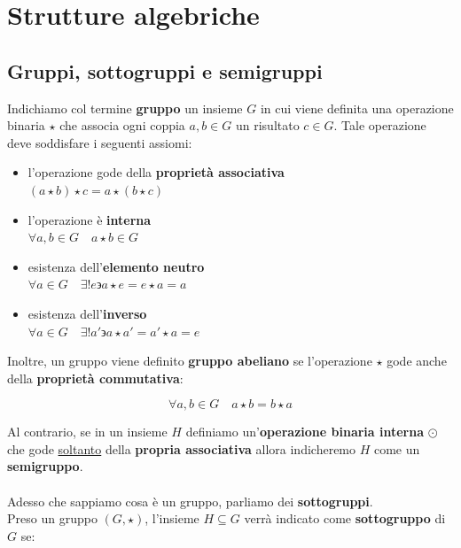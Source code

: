 \section{Strutture algebriche}
\subsection{Gruppi, sottogruppi e semigruppi}
Indichiamo col termine \textbf{gruppo} un insieme \(G\) in cui viene definita
una operazione binaria \(\star\) che associa ogni coppia \(a,b \in G\) un risultato
\(c \in G\). Tale operazione deve soddisfare i seguenti assiomi:

\begin{itemize}

  \item 
  l'operazione gode della \textbf{proprietà associativa} \\
  \((a \star b) \star c = a \star (b \star c)\) \\

  \item 
  l'operazione è \textbf{interna} \\
  \( \forall a,b \in G \quad a \star b \in G\)

  \item
  esistenza dell'\textbf{elemento neutro} \\
  \( \forall a \in G \quad \exists!e \backepsilon a \star e = e \star a = a \) \\

  \item
  esistenza dell'\textbf{inverso} \\
  \( \forall a \in G \quad \exists!a' \backepsilon a \star a' = a' \star a = e \) \\

\end{itemize}

Inoltre, un gruppo viene definito \textbf{gruppo abeliano} se l'operazione \(\star\) 
gode anche della \textbf{proprietà commutativa}:

\[ \forall a,b \in G \quad a \star b = b \star a\]

Al contrario, se in un insieme \(H\) definiamo un'\textbf{operazione binaria interna} \(\odot\) 
che gode \underline{soltanto} della \textbf{propria associativa} allora indicheremo \(H\)
come un \textbf{semigruppo}.
\\
\\
Adesso che sappiamo cosa è un gruppo, parliamo dei \textbf{sottogruppi}. \\
Preso un gruppo \((G, \star)\), l'insieme \(H \subseteq G\) verrà indicato 
come \textbf{sottogruppo} di \(G\) se:

